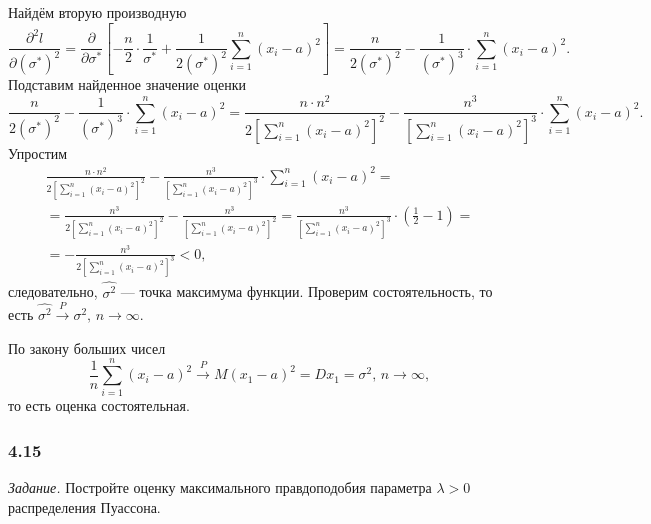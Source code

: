 Найдём вторую производную
$$ \frac{ \partial^2 l}{ \partial \left( \sigma^* \right)^2} =
  \frac{ \partial }{ \partial \sigma^*}
    \left[
      - \frac{n}{2} \cdot \frac{1}{ \sigma^*} +
      \frac{1}{2 \left( \sigma^* \right)^2} \sum \limits_{i = 1}^n \left( x_i - a \right)^2
    \right] =
  \frac{n}{2 \left( \sigma^* \right)^2} -
  \frac{1}{ \left( \sigma^* \right)^3} \cdot \sum \limits_{i = 1}^n \left( x_i - a \right)^2.$$
Подставим найденное значение оценки
$$ \frac{n}{2 \left( \sigma^* \right)^2} -
  \frac{1}{ \left( \sigma^* \right)^3} \cdot \sum \limits_{i = 1}^n \left( x_i - a \right)^2 =
  \frac{n \cdot n^2}{2 \left[ \sum \limits_{i = 1}^n \left( x_i - a \right)^2 \right]^2} -
  \frac{n^3}{ \left[ \sum \limits_{i = 1}^n \left( x_i - a \right)^2 \right]^3} \cdot
  \sum \limits_{i = 1}^n \left( x_i - a \right)^2.$$
Упростим
\begin{equation*}
  \begin{split}
    \frac{n \cdot n^2}{2 \left[ \sum \limits_{i = 1}^n \left( x_i - a \right)^2 \right]^2} -
    \frac{n^3}{ \left[ \sum \limits_{i = 1}^n \left( x_i - a \right)^2 \right]^3} \cdot
    \sum \limits_{i = 1}^n \left( x_i - a \right)^2 = \\
    = \frac{n^3}{2 \left[ \sum \limits_{i = 1}^n \left( x_i - a \right)^2 \right]^2} -
    \frac{n^3}{ \left[ \sum \limits_{i = 1}^n \left( x_i - a \right)^2 \right]^2} =
    \frac{n^3}{ \left[ \sum \limits_{i = 1}^n \left( x_i - a \right)^2 \right]^3} \cdot
    \left( \frac{1}{2} - 1 \right) = \\
    = - \frac{n^3}{2 \left[ \sum \limits_{i = 1}^n \left( x_i - a \right)^2 \right]^3} <
    0,
  \end{split}
\end{equation*}
следовательно, $ \hat{ \sigma^2}$ --- точка максимума функции.
Проверим состоятельность, то есть $ \hat{ \sigma^2} \overset{P}{ \to } \sigma^2, \, n \to \infty $.

По закону больших чисел
$$ \frac{1}{n} \sum \limits_{i = 1}^n \left( x_i - a \right)^2 \overset{P}{ \to }
  M \left( x_1 - a \right)^2 =
  Dx_1 =
  \sigma^2, \,
  n \to \infty,$$
то есть оценка состоятельная.

\subsubsection*{4.15}

\textit{Задание.}
Постройте оценку максимального правдоподобия параметра $ \lambda > 0$ распределения Пуассона.

